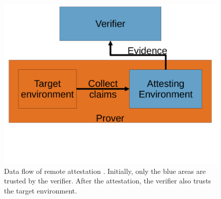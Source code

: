 \begin{figure}[htpb]
  \centering
  \includegraphics[trim={0 5cm 0 0}, width=0.5\linewidth]{figures/remote_attestation.pdf}
  \caption{Data flow of remote attestation \cite{rfc9334}. Initially, only the blue areas are trusted by the verifier. After the attestation, the verifier also trusts the target environment.} \label{fig:ra}
\end{figure}
